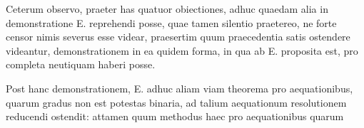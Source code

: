 Ceterum observo, praeter has quatuor obiectiones, adhuc quaedam alia in
demonstratione E. reprehendi posse, quae tamen silentio praetereo, ne forte censor
nimis severus esse videar, praesertim quum praecedentia satis ostendere videantur,
demonstrationem in ea quidem forma, in qua ab E. proposita est, pro
completa neutiquam haberi posse.

Post hanc demonstrationem, E. adhuc aliam viam theorema pro aequationibus,
quarum gradus non est potestas binaria, ad talium aequationum resolutionem
reducendi ostendit: attamen quum methodus haec pro aequationibus quarum

